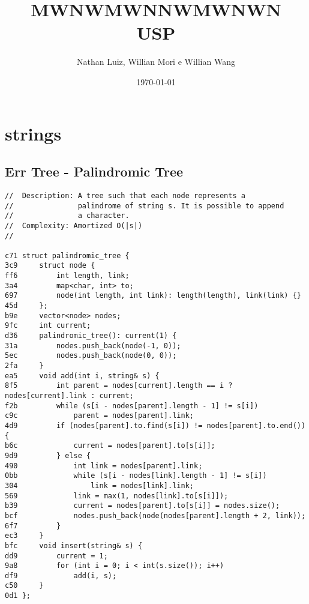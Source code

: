 \documentclass[11pt, a4paper, twoside]{article}
\title{MWNWMWNNWMWNWN \\ USP}
\author{Nathan Luiz, Willian Mori e Willian Wang}
\begin{document}
\twocolumn
\date{\today}
\maketitle


\renewcommand{\contentsname}{Índice} %
\tableofcontents


%
%

\section{strings}

\subsection{ Err Tree - Palindromic Tree}
\begin{lstlisting}
//  Description: A tree such that each node represents a 
//               palindrome of string s. It is possible to append
//               a character.
//  Complexity: Amortized O(|s|)
//

c71 struct palindromic_tree {
3c9     struct node {
ff6         int length, link;
3a4         map<char, int> to;
697         node(int length, int link): length(length), link(link) {}
45d     };
b9e     vector<node> nodes;
9fc     int current;
d36     palindromic_tree(): current(1) {
31a         nodes.push_back(node(-1, 0));
5ec         nodes.push_back(node(0, 0));
2fa     }
ea5     void add(int i, string& s) {
8f5         int parent = nodes[current].length == i ? nodes[current].link : current;
f2b         while (s[i - nodes[parent].length - 1] != s[i])
c9c             parent = nodes[parent].link;
4d9         if (nodes[parent].to.find(s[i]) != nodes[parent].to.end()) {
b6c             current = nodes[parent].to[s[i]];
9d9         } else {
490             int link = nodes[parent].link;
0bb             while (s[i - nodes[link].length - 1] != s[i])
304                 link = nodes[link].link;
569             link = max(1, nodes[link].to[s[i]]);
b39             current = nodes[parent].to[s[i]] = nodes.size();
bcf             nodes.push_back(node(nodes[parent].length + 2, link));
6f7         }
ec3     }
bfc     void insert(string& s) {
dd9         current = 1;
9a8         for (int i = 0; i < int(s.size()); i++)
df9             add(i, s);
c50     }
0d1 };
\end{lstlisting}
\end{document}
